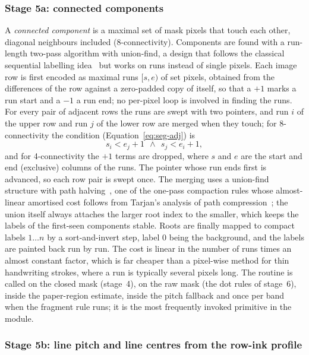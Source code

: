 \subsubsection{Stage 5a: connected components}

A \emph{connected component} is a maximal set of mask pixels that touch each other, diagonal neighbours included (8-connectivity).
Components are found with a run-length two-pass algorithm with union-find, a design that follows the classical sequential labelling idea~\cite{rosenfeld1966} but works on runs instead of single pixels.
Each image row is first encoded as maximal runs $[s,e)$ of set pixels, obtained from the differences of the row against a zero-padded copy of itself, so that a $+1$ marks a run start and a $-1$ a run end; no per-pixel loop is involved in finding the runs.
For every pair of adjacent rows the runs are swept with two pointers, and run $i$ of the upper row and run $j$ of the lower row are merged when they touch; for 8-connectivity the condition (Equation~\ref{eq:seg-adj}) is
\begin{equation}
s_i<e_j+1\ \ \wedge\ \ s_j<e_i+1,
\label{eq:seg-adj}
\end{equation}
and for 4-connectivity the $+1$ terms are dropped, where $s$ and $e$ are the start and end (exclusive) columns of the runs.
The pointer whose run ends first is advanced, so each row pair is swept once.
The merging uses a union-find structure with path halving~\cite{tarjan1984}, one of the one-pass compaction rules whose almost-linear amortised cost follows from Tarjan's analysis of path compression~\cite{tarjan1975}; the union itself always attaches the larger root index to the smaller, which keeps the labels of the first-seen components stable.
Roots are finally mapped to compact labels $1\ldots n$ by a sort-and-invert step, label 0 being the background, and the labels are painted back run by run.
The cost is linear in the number of runs times an almost constant factor, which is far cheaper than a pixel-wise method for thin handwriting strokes, where a run is typically several pixels long.
The routine is called on the closed mask (stage~4), on the raw mask (the dot rules of stage~6), inside the paper-region estimate, inside the pitch fallback and once per band when the fragment rule runs; it is the most frequently invoked primitive in the module.

\subsubsection{Stage 5b: line pitch and line centres from the row-ink profile}

